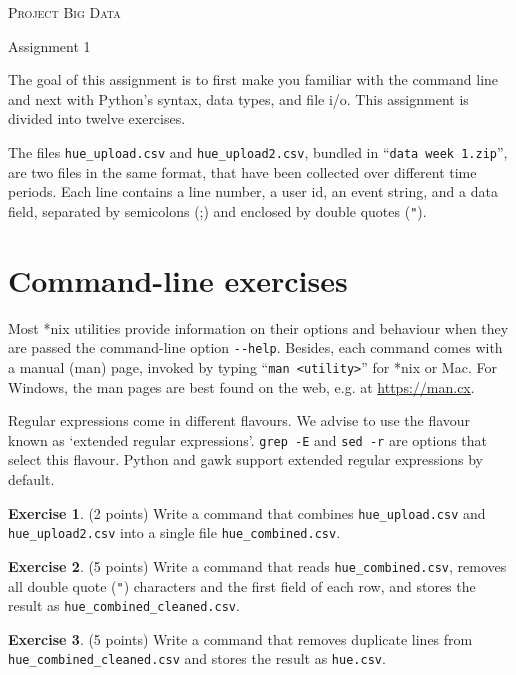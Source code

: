 \documentclass[a4paper]{report}
\theoremstyle{definition}
\newtheorem{exercise}{Exercise}
\newcommand{\blankline}{\par\vspace{5mm}}
\newcommand{\doublequote}{\texttt{"}}
\begin{document}
	
	\begin{center}
		\textsc{\Large Project Big Data}
		\blankline
		
		{\large Assignment 1}
	\end{center}
	
	\blankline \noindent The goal of this assignment is to first make you familiar with the command line and next with Python’s syntax, data types, and file i/o. This assignment is divided into twelve exercises.
	
	The files \texttt{hue\_upload.csv} and \texttt{hue\_upload2.csv}, bundled in ``\texttt{data week 1.zip}'',
	are two files in the same format, that have been collected over different time periods. Each line contains a line number, a user id, an event string, and a data field, separated by semicolons (;) and enclosed by double quotes (\doublequote{}).
	
	\section*{Command-line exercises}
	\label{command-line-exercises}
	
	Most *nix utilities provide information on their options and behaviour when
	they are passed the command-line option \texttt{-{}-help}. Besides, each
	command comes with a manual (man) page, invoked by typing ``\texttt{man
		<utility>}'' for
	*nix or Mac. For Windows, the man pages are best found on the web, e.g.
	at \url{https://man.cx}.
	
	Regular expressions come in different flavours. We advise to use the flavour
	known as `extended regular expressions'. \texttt{grep -E} and \texttt{sed -r}
	are options that select this flavour. Python and gawk support extended regular
	expressions by default.
	
	\begin{exercise}
		(2 points) Write a command that combines \texttt{hue\_upload.csv} and \texttt{hue\_upload2.csv} into a single file \texttt{hue\_combined.csv}.
	\end{exercise}
	
	\begin{exercise}
		(5 points) Write a command that reads \texttt{hue\_combined.csv}, removes all double quote (\doublequote) characters and the first field of each row, and stores the result as \texttt{hue\_combined\_cleaned.csv}.
	\end{exercise}
	
	\begin{exercise}
		(5 points) Write a command that removes duplicate lines from \texttt{hue\_combined\_cleaned.csv} and stores the result as \texttt{hue.csv}.
	\end{exercise}
	
\end{document}
